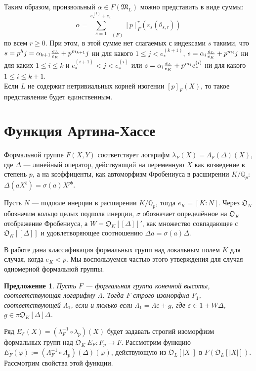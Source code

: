 \documentclass[a4paper]{article}
\newcommand{\Qp}{\mathbb{Q}_p}
\newcommand{\ML}{\mathfrak{M}_L}
\newcommand{\OK}{\mathfrak{O}_K}
\newcommand{\ON}{\mathfrak{O}_N}
\newcommand{\OL}{\mathfrak{O}_L}
\newcommand{\Leq}{\leqslant}
\newcommand{\Geq}{\geqslant}
\newtheorem{proposition}{Предложение}
\begin{document}
Таким образом, произвольный $\alpha \in F(\ML)$ можно представить в виде суммы: 
$$\alpha = {\sum\limits_{s=1}^{e_*^{(1)} + e_L}}_{(F)}[p]_F^r(\varepsilon_s(\theta_{s,r}))$$
по всем $r \Geq 0$. При этом, в этой сумме нет слагаемых с индексами $s$ такими, что $s = p^hj=\alpha_{k+1}{e_L \over e_K} + p^{m_{k+1}}j$ ни для какого $1 \Leq j < e_*^{(k+1)}$, $s = \alpha_i{e_L \over e_K}+p^{m_i}j$ ни для каких $1\Leq i\Leq k$ и $e_*^{(i+1)} < j < e_*^{(i)}$ или $s = \alpha_i{e_L \over e_K} + p^{m_i}e_*^{(i)}$ ни для какого $1\Leq i\Leq k+1$.\\
Если $L$ не содержит нетривиальных корней изогении $[p]_F(X)$, то такое представление будет единственным.


\section{Функция Артина-Хассе}
\paragraph{}

Формальной группе $F(X,Y)$ соответствует логарифм $\lambda_F(X)=\Lambda_F(\Delta)(X)$, где $\Delta$ --- линейный оператор, действующий на переменную $X$ как возведение в степень $p$, а на коэффиценты, как автоморфизм Фробениуса в расширении $K/\Qp$: $\Delta(aX^b)=\sigma(a)X^{pb}$.

Пусть $N$ --- подполе инерции в расширении $K/\Qp$, тогда $e_K=[K:N]$. Через $\ON$ обозначим кольцо целых подполя инерции, $\sigma$ обозначает определённое на $\OK$ отображение Фробениуса, а $W=\OK[[\Delta]]'$, как множество совпадающее с $\OK[[\Delta]]$ и удовлетворяющее соотношению $\Delta a = \sigma(a)\Delta$. 

В работе \cite[Теорема 6.3.1]{book3} дана классификация формальных групп над локальным полем $K$ для случая, когда $e_K < p$. Мы воспользуемся частью этого утверждения для случая одномерной формальной группы.
\begin{proposition}
	Пусть $F$ --- формальная группа конечной высоты, соответствующая логарифму $\Lambda$. Тогда $F$ строго изоморфна $F_1$, соответствующей $\Lambda_1$, если и только если $\Lambda_1 = \Lambda\varepsilon + g$, где $\varepsilon \in 1 + W\Delta$, $g \in \pi\OK[\Delta]\Delta$.
\end{proposition}

Ряд $E_F(X)=(\lambda_F^{-1}\circ\lambda_{p})(X)$ будет задавать строгий изоморфизм формальных групп над $\OK\ E_F: F_{p} \rightarrow F$.
Рассмотрим функцию $E_F(\varphi):=(\Lambda_F^{-1}\circ\Lambda_{p})(\Delta)(\varphi)$, действующую из $\OL[|X|]$ в $F(\OL[|X|])$. Рассмотрим свойства этой функции.
\end{document}
